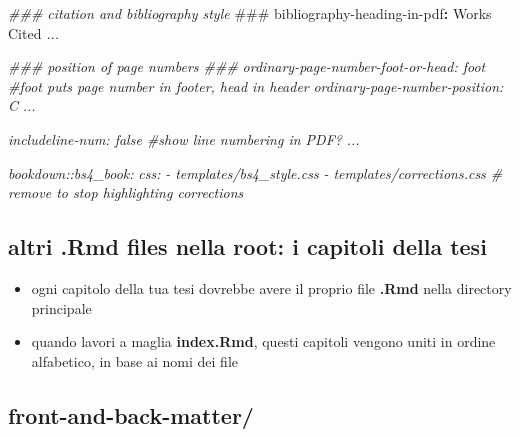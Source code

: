 \documentclass[a4paper, 11pt, nobind]{templates/ociamthesis}
\newenvironment{Shaded}{\begin{snugshade}}{\end{snugshade}}
\newcommand{\AlertTok}[1]{\textcolor[rgb]{0.94,0.16,0.16}{#1}}
\newcommand{\AttributeTok}[1]{\textcolor[rgb]{0.77,0.63,0.00}{#1}}
\newcommand{\CommentTok}[1]{\textcolor[rgb]{0.56,0.35,0.01}{\textit{#1}}}
\newcommand{\FunctionTok}[1]{\textcolor[rgb]{0.00,0.00,0.00}{#1}}
\newcommand{\KeywordTok}[1]{\textcolor[rgb]{0.13,0.29,0.53}{\textbf{#1}}}
\renewenvironment{Shaded}
{
  \vspace{10pt}%
  \begin{snugshade}%
}{%
  \end{snugshade}%
  \vspace{8pt}%
}
\begin{document}
\begin{Shaded}
\begin{Highlighting}[]
\CommentTok{\#\#\# citation and bibliography style }\AlertTok{\#\#\#}
\FunctionTok{bibliography{-}heading{-}in{-}pdf}\KeywordTok{:}\AttributeTok{ Works Cited}
\CommentTok{...}

\CommentTok{\#\#\# position of page numbers \#\#\#}
\CommentTok{ordinary{-}page{-}number{-}foot{-}or{-}head: foot \#\textquotesingle{}foot\textquotesingle{} puts page number in footer, \textquotesingle{}head\textquotesingle{} in header}
\CommentTok{ordinary{-}page{-}number{-}position: C}
\CommentTok{...}

\CommentTok{includeline{-}num: false \#show line numbering in PDF?}
\CommentTok{...}

\CommentTok{  bookdown::bs4\_book: }
\CommentTok{    css: }
\CommentTok{      {-} templates/bs4\_style.css}
\CommentTok{      {-} templates/corrections.css \# remove to stop highlighting corrections}
\end{Highlighting}
\end{Shaded}

\hypertarget{altri-.rmd-files-nella-root-i-capitoli-della-tesi}{%
\subsection{\texorpdfstring{altri \textbf{.Rmd} files nella root: i capitoli della tesi}{altri .Rmd files nella root: i capitoli della tesi}}\label{altri-.rmd-files-nella-root-i-capitoli-della-tesi}}

\begin{itemize}
\item
  ogni capitolo della tua tesi dovrebbe avere il proprio file \textbf{.Rmd} nella directory principale
\item
  quando lavori a maglia \textbf{index.Rmd}, questi capitoli vengono uniti in ordine alfabetico, in base ai nomi dei file
\end{itemize}

\hypertarget{front-and-back-matter}{%
\subsection{\texorpdfstring{\textbf{front-and-back-matter/}}{front-and-back-matter/}}\label{front-and-back-matter}}
\end{document}
